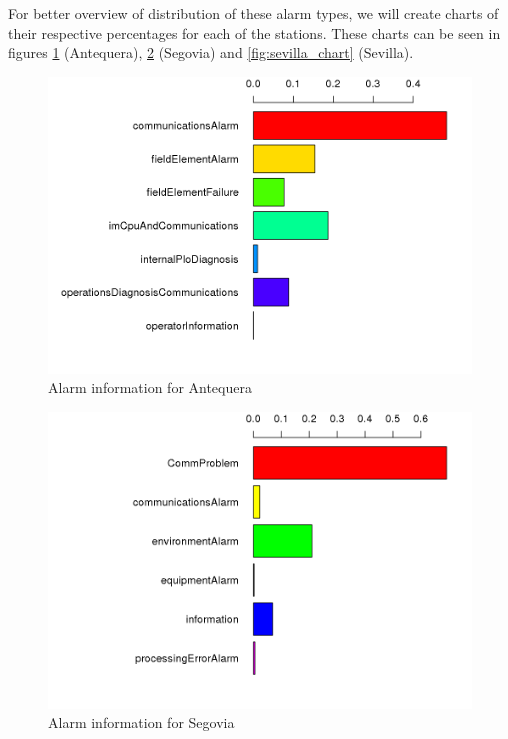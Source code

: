 \documentclass[a4paper,12pt]{article}
\begin{document}
For better overview of distribution of these alarm types, we will create charts of their respective percentages for each of the stations. These charts can be seen in figures \ref{fig:antequera_chart} (Antequera), \ref{fig:segovia_chart} (Segovia) and \ref{fig:sevilla_chart} (Sevilla).

\begin{figure}[htb]
 \centering
 \includegraphics[width=\textwidth]{./img/antequera_graph.png}
 \caption{Alarm information for Antequera}
 \label{fig:antequera_chart}
\end{figure}
\begin{figure}[htb]
 \centering
 \includegraphics[width=\textwidth]{./img/segovia_graph.png}
 \caption{Alarm information for Segovia}
 \label{fig:segovia_chart}
\end{figure}
\end{document}
